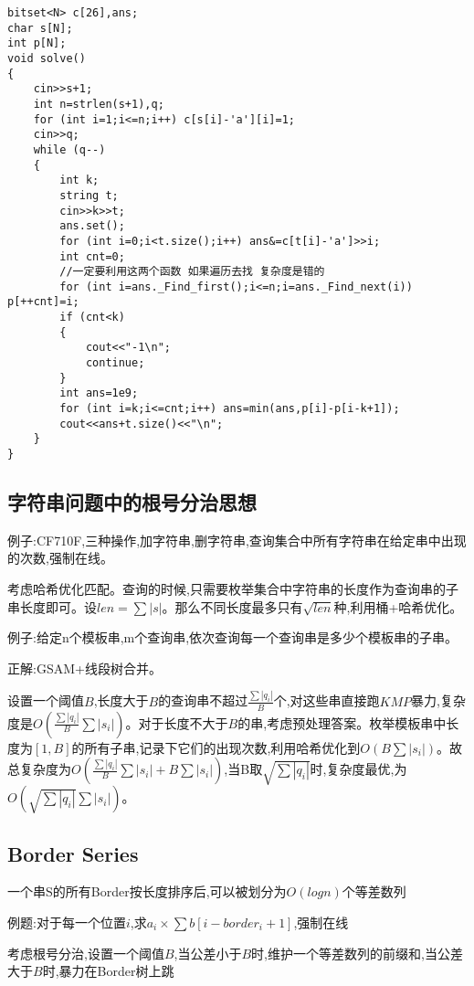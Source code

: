 \documentclass[a4paper]{ctexart}
\begin{document}
\begin{lstlisting}
bitset<N> c[26],ans;
char s[N];
int p[N];
void solve()
{
    cin>>s+1;
    int n=strlen(s+1),q;
    for (int i=1;i<=n;i++) c[s[i]-'a'][i]=1;
    cin>>q;
    while (q--)
    {
        int k;
        string t;
        cin>>k>>t;
        ans.set();
        for (int i=0;i<t.size();i++) ans&=c[t[i]-'a']>>i;
        int cnt=0;
        //一定要利用这两个函数 如果遍历去找 复杂度是错的
        for (int i=ans._Find_first();i<=n;i=ans._Find_next(i)) p[++cnt]=i;
        if (cnt<k)
        {
            cout<<"-1\n";
            continue;
        }
        int ans=1e9;
        for (int i=k;i<=cnt;i++) ans=min(ans,p[i]-p[i-k+1]);
        cout<<ans+t.size()<<"\n"; 
    }
}
\end{lstlisting}

\subsection{字符串问题中的根号分治思想}

例子:CF710F,三种操作,加字符串,删字符串,查询集合中所有字符串在给定串中出现的次数,强制在线。

考虑哈希优化匹配。查询的时候,只需要枚举集合中字符串的长度作为查询串的子串长度即可。设$len=\sum|s|$。那么不同长度最多只有$\sqrt{len}$种,利用桶+哈希优化。

例子:给定n个模板串,m个查询串,依次查询每一个查询串是多少个模板串的子串。

正解:GSAM+线段树合并。

设置一个阈值$B$,长度大于$B$的查询串不超过$\frac{\sum|q_i|}{B}$个,对这些串直接跑$KMP$暴力,复杂度是$O(\frac{\sum|q_i|}{B}\sum|s_i|)$。对于长度不大于$B$的串,考虑预处理答案。枚举模板串中长度为$[1,B]$的所有子串,记录下它们的出现次数,利用哈希优化到$O(B\sum|s_i|)$。故总复杂度为$O(\frac{\sum|q_i|}{B}\sum|s_i|+B\sum|s_i|)$,当B取$\sqrt{\sum|q_i|}$时,复杂度最优,为$O(\sqrt{\sum|q_i|}\sum|s_i|)$。

\subsection{Border Series}

一个串S的所有Border按长度排序后,可以被划分为$O(logn)$个等差数列

例题:对于每一个位置$i$,求$a_i\times \sum b[i-border_i+1]$,强制在线

考虑根号分治,设置一个阈值$B$,当公差小于$B$时,维护一个等差数列的前缀和,当公差大于$B$时,暴力在Border树上跳
\end{document}
